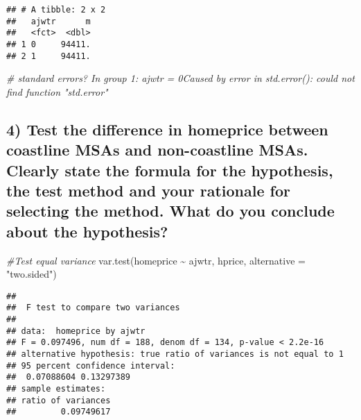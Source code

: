 \documentclass[
  12pt,
]{article}
\newenvironment{Shaded}{\begin{snugshade}}{\end{snugshade}}
\newcommand{\AttributeTok}[1]{\textcolor[rgb]{0.77,0.63,0.00}{#1}}
\newcommand{\CommentTok}[1]{\textcolor[rgb]{0.56,0.35,0.01}{\textit{#1}}}
\newcommand{\FunctionTok}[1]{\textcolor[rgb]{0.00,0.00,0.00}{#1}}
\newcommand{\NormalTok}[1]{#1}
\newcommand{\SpecialCharTok}[1]{\textcolor[rgb]{0.00,0.00,0.00}{#1}}
\newcommand{\StringTok}[1]{\textcolor[rgb]{0.31,0.60,0.02}{#1}}
\begin{document}
\begin{verbatim}
## # A tibble: 2 x 2
##   ajwtr      m
##   <fct>  <dbl>
## 1 0     94411.
## 2 1     94411.
\end{verbatim}

\begin{Shaded}
\begin{Highlighting}[]
\CommentTok{\# standard errors?    In group 1: \textasciigrave{}ajwtr = 0\textasciigrave{}Caused by error in \textasciigrave{}std.error()\textasciigrave{}: could not find function "std.error"}
\end{Highlighting}
\end{Shaded}

\hypertarget{test-the-difference-in-homeprice-between-coastline-msas-and-non-coastline-msas.-clearly-state-the-formula-for-the-hypothesis-the-test-method-and-your-rationale-for-selecting-the-method.-what-do-you-conclude-about-the-hypothesis}{%
\subsection{4) Test the difference in homeprice between coastline MSAs
and non-coastline MSAs. Clearly state the formula for the hypothesis,
the test method and your rationale for selecting the method. What do you
conclude about the
hypothesis?}\label{test-the-difference-in-homeprice-between-coastline-msas-and-non-coastline-msas.-clearly-state-the-formula-for-the-hypothesis-the-test-method-and-your-rationale-for-selecting-the-method.-what-do-you-conclude-about-the-hypothesis}}

\begin{Shaded}
\begin{Highlighting}[]
\CommentTok{\#Test equal variance}
\FunctionTok{var.test}\NormalTok{(homeprice }\SpecialCharTok{\textasciitilde{}}\NormalTok{ ajwtr, hprice, }\AttributeTok{alternative =} \StringTok{"two.sided"}\NormalTok{)}
\end{Highlighting}
\end{Shaded}

\begin{verbatim}
## 
##  F test to compare two variances
## 
## data:  homeprice by ajwtr
## F = 0.097496, num df = 188, denom df = 134, p-value < 2.2e-16
## alternative hypothesis: true ratio of variances is not equal to 1
## 95 percent confidence interval:
##  0.07088604 0.13297389
## sample estimates:
## ratio of variances 
##         0.09749617
\end{verbatim}
\end{document}
